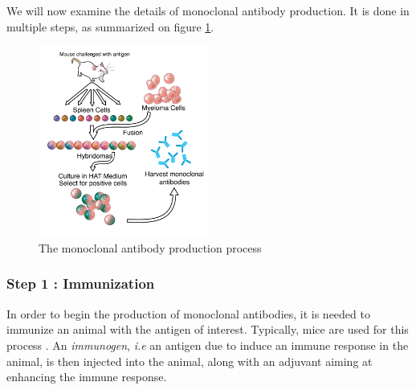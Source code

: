 We will now examine the details of monoclonal antibody production.
It is done in multiple steps, as summarized on figure \ref{fig:Monoclonal_Antibody_Production}.

\begin{figure}[H]
    \begin{center}
        \includegraphics[width=0.5\textwidth]{../Images/mab_hybridomas.png}
        \caption{The monoclonal antibody production process}
        \label{fig:Monoclonal_Antibody_Production}
    \end{center}
\end{figure}


\subsubsection{Step 1 : Immunization}

In order to begin the production of monoclonal antibodies, it is
needed to immunize an animal with the antigen of interest. Typically, 
mice are used for this process \cite{leenaars_critical_2005}. 
An \emph{immunogen}, \textit{i.e} an antigen due to induce an immune response
in the animal, is then injected into the animal, along with an adjuvant
aiming at enhancing the immune response.

